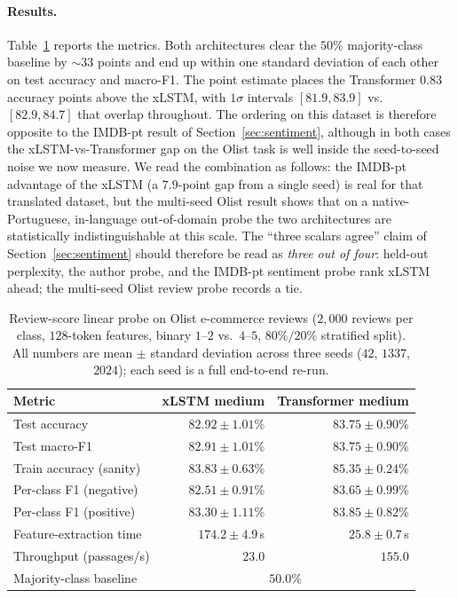 \documentclass[11pt]{article}
\begin{document}
\paragraph{Results.}
Table~\ref{tab:olist} reports the metrics. Both architectures clear
the $50\%$ majority-class baseline by $\sim$33 points and end up
within one standard deviation of each other on test accuracy and
macro-F1. The point estimate places the Transformer $0.83$ accuracy
points above the xLSTM, with $1\sigma$ intervals
$[81.9, 83.9]$ vs.\ $[82.9, 84.7]$ that overlap throughout. The
ordering on this dataset is therefore opposite to the IMDB-pt
result of Section~\ref{sec:sentiment}, although in both cases the
xLSTM-vs-Transformer gap on the Olist task is well inside the
seed-to-seed noise we now measure. We read the combination as
follows: the IMDB-pt advantage of the xLSTM (a $7.9$-point gap from a
single seed) is real for that translated dataset, but the multi-seed
Olist result shows that on a native-Portuguese, in-language
out-of-domain probe the two architectures are statistically
indistinguishable at this scale. The ``three scalars agree'' claim
of Section~\ref{sec:sentiment} should therefore be read as
\emph{three out of four}: held-out perplexity, the author probe, and
the IMDB-pt sentiment probe rank xLSTM ahead; the multi-seed Olist
review probe records a tie.

\begin{table}[h]
\centering
\caption{Review-score linear probe on Olist e-commerce reviews
  ($2{,}000$ reviews per class, $128$-token features, binary
  $1$--$2$ vs.\ $4$--$5$, $80\%/20\%$ stratified split). All numbers
  are mean $\pm$ standard deviation across three seeds
  ($42$, $1337$, $2024$); each seed is a full end-to-end re-run.}
\label{tab:olist}
\small
\setlength{\tabcolsep}{6pt}
\begin{tabular}{lrr}
\toprule
Metric & xLSTM medium & Transformer medium \\
\midrule
Test accuracy            & $82.92 \pm 1.01\%$ & $\mathbf{83.75 \pm 0.90\%}$ \\
Test macro-F1            & $82.91 \pm 1.01\%$ & $\mathbf{83.75 \pm 0.90\%}$ \\
Train accuracy (sanity)  & $83.83 \pm 0.63\%$ & $85.35 \pm 0.24\%$ \\
Per-class F1 (negative)  & $82.51 \pm 0.91\%$ & $\mathbf{83.65 \pm 0.99\%}$ \\
Per-class F1 (positive)  & $83.30 \pm 1.11\%$ & $\mathbf{83.85 \pm 0.82\%}$ \\
Feature-extraction time  & $174.2 \pm 4.9$\,s & $\mathbf{25.8 \pm 0.7}$\,s \\
Throughput (passages/s)  & $23.0$            & $\mathbf{155.0}$ \\
Majority-class baseline  & \multicolumn{2}{c}{$50.0\%$} \\
\bottomrule
\end{tabular}
\end{table}
\end{document}
